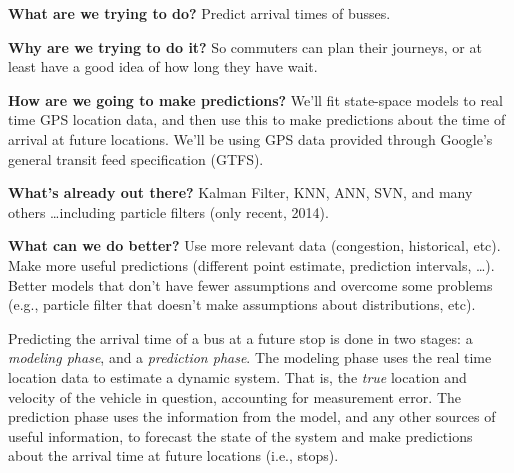 \documentclass[12pt,a4paper]{article}
\begin{document}









\textbf{What are we trying to do? }
Predict arrival times of busses.

\textbf{Why are we trying to do it?}
So commuters can plan their journeys, or at least have a good idea of how long they have wait.

\textbf{How are we going to make predictions?}
We'll fit state-space models to real time GPS location data,
and then use this to make predictions about the time of arrival at future locations.
We'll be using GPS data provided through Google's general transit feed specification (GTFS).


\textbf{What's already out there?}
Kalman Filter, KNN, ANN, SVN, and many others \ldots including particle filters (only recent, 2014).

\textbf{What can we do better?}
Use more relevant data (congestion, historical, etc).
Make more useful predictions (different point estimate, prediction intervals, \ldots).
Better models that don't have fewer assumptions and overcome some problems 
(e.g., particle filter that doesn't make assumptions about distributions, etc).


Predicting the arrival time of a bus at a future stop is done in two stages:
a \emph{modeling phase}, and a \emph{prediction phase}.
The modeling phase uses the real time location data to estimate a dynamic system.
That is, the \emph{true} location and velocity of the vehicle in question,
accounting for measurement error.
The prediction phase uses the information from the model, and any other sources of useful information,
to forecast the state of the system and make predictions about the arrival time at future locations (i.e., stops).
\end{document}
